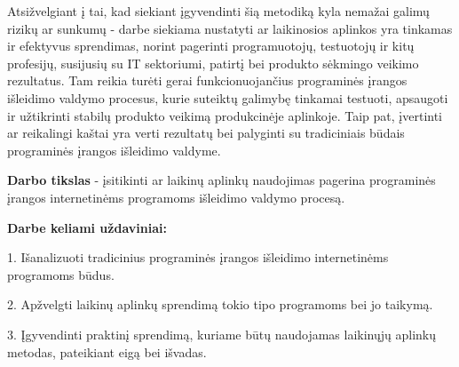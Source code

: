 \documentclass{VUMIFPSkursinis}
\begin{document}
 Atsižvelgiant į tai, kad siekiant įgyvendinti šią metodiką kyla nemažai galimų rizikų ar sunkumų - darbe siekiama nustatyti ar laikinosios aplinkos yra tinkamas ir efektyvus sprendimas, norint pagerinti programuotojų, testuotojų ir kitų profesijų, susijusių su IT sektoriumi, patirtį bei produkto sėkmingo veikimo rezultatus. Tam reikia turėti gerai funkcionuojančius programinės įrangos išleidimo valdymo procesus, kurie suteiktų galimybę tinkamai testuoti, apsaugoti ir užtikrinti stabilų produkto veikimą produkcinėje aplinkoje. Taip pat, įvertinti ar reikalingi kaštai yra verti rezultatų bei palyginti su tradiciniais būdais programinės įrangos išleidimo valdyme.

\bigskip



\textbf{Darbo tikslas} - įsitikinti ar laikinų aplinkų naudojimas pagerina programinės įrangos internetinėms programoms išleidimo valdymo procesą.

\textbf{Darbe keliami uždaviniai:}


1. Išanalizuoti tradicinius programinės įrangos išleidimo internetinėms programoms būdus.

2. Apžvelgti laikinų aplinkų sprendimą tokio tipo programoms bei jo taikymą.

3. Įgyvendinti praktinį sprendimą, kuriame būtų naudojamas laikinųjų aplinkų metodas, pateikiant eigą bei išvadas.




\end{document}
